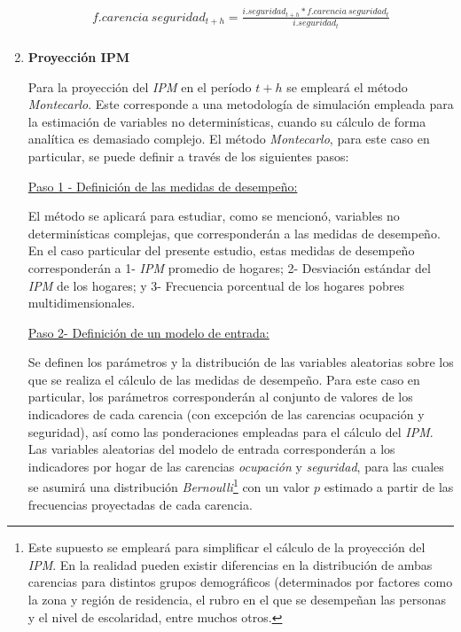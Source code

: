 \documentclass[12pt,letterpaper,spanish]{article}
\begin{document}
\begin{enumerate}
    \begin{equation}\label{calculo_proyeccion_seguridad}
        \begin{split}
            f.carencia\:seguridad_{t+h}=\frac{i.seguridad_{t+h}*f.carencia\:seguridad_t}{i.seguridad_t}\\
        \end{split}
    \end{equation}
    
    
    \item \textbf{Proyección IPM}


Para la proyección del \textit{IPM} en el período $t+h$ se empleará el método \textit{Montecarlo}. Este corresponde a una metodología de simulación empleada para la estimación de variables no determinísticas, cuando su cálculo de forma analítica es demasiado complejo. El método \textit{Montecarlo}, para este caso en particular, se puede definir a través de los siguientes pasos:

\vspace{2em}

\underline{Paso 1 - Definición de las medidas de desempeño:} 

El método se aplicará para estudiar, como se mencionó, variables no determinísticas complejas, que corresponderán a las medidas de desempeño. En el caso particular del presente estudio, estas medidas de desempeño corresponderán a 1- \textit{IPM} promedio de hogares; 2- Desviación estándar del \textit{IPM} de los hogares; y 3- Frecuencia porcentual de los hogares pobres multidimensionales.

\vspace{2em}
        
\underline{Paso 2- Definición de un modelo de entrada:} 

Se definen los parámetros y la distribución de las variables aleatorias sobre los que se realiza el cálculo de las medidas de desempeño. Para este caso en particular, los parámetros corresponderán al conjunto de valores de los indicadores de cada carencia (con excepción de las carencias ocupación y seguridad), así como las ponderaciones empleadas para el cálculo del \textit{IPM}. Las variables aleatorias del modelo de entrada corresponderán a los indicadores por hogar de las carencias \textit{ocupación} y \textit{seguridad}, para las cuales se asumirá una distribución \textit{Bernoulli}\footnote{Este supuesto se empleará para simplificar el cálculo de la proyección del \textit{IPM}. En la realidad pueden existir diferencias en la distribución de ambas carencias para distintos grupos demográficos (determinados por factores como la zona y región de residencia, el rubro en el que se desempeñan las personas y el nivel de escolaridad, entre muchos otros.} con un valor $p$ estimado a partir de las frecuencias proyectadas de cada carencia.\\
        


\end{enumerate}
\end{document}
